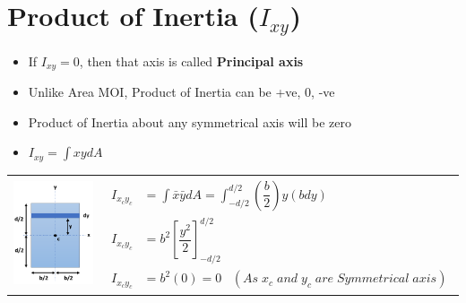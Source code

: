 \documentclass[8pt]{report}
\begin{document}
	\section{Product of Inertia ($I_{xy}$)}
		\begin{itemize}
			\item If $I_{xy} = 0$, then that axis is called \textbf{Principal axis}
			\item Unlike Area MOI, Product of Inertia can be +ve, 0, -ve
			\item Product of Inertia about any symmetrical axis will be zero
			\item $\boxed{I_{xy} = \int xydA}$
		\end{itemize}
		\begin{table}[H]
		\centering
		\begin{tabular}{cc}
			\parbox{5cm}{\includegraphics[scale=0.4]{rectangleMOI_Ix.png}} 
			& \parbox{7cm}{
			\begin{align*}
				I_{x_cy_c} &= \int \bar{x}\bar{y}dA = \int_{-d/2}^{d/2} \left(\dfrac{b}{2}\right)y(bdy)\\
				I_{x_cy_c} &= b^2\left[\dfrac{y^2}{2}\right]_{-d/2}^{d/2}\\
				I_{x_cy_c} &= b^2(0) = 0\;\;\;(As\;x_c\;and\;y_c\;are\;Symmetrical\;axis)
			\end{align*}}
		\end{tabular}
	\end{table}\hrulefill
\end{document}
